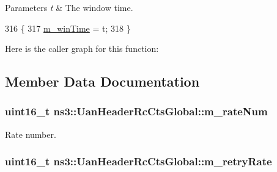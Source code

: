 \begin{DoxyParams}{Parameters}
{\em t} & The window time. \\
\hline
\end{DoxyParams}

\begin{DoxyCode}
316 \{
317   \hyperlink{classns3_1_1UanHeaderRcCtsGlobal_a94365aeacbedf98a9a92b3c310a591d3}{m\_winTime} = t;
318 \}
\end{DoxyCode}


Here is the caller graph for this function\+:




\subsection{Member Data Documentation}
\subsubsection[{\texorpdfstring{m\+\_\+rate\+Num}{m_rateNum}}]{\setlength{\rightskip}{0pt plus 5cm}uint16\+\_\+t ns3\+::\+Uan\+Header\+Rc\+Cts\+Global\+::m\+\_\+rate\+Num\hspace{0.3cm}{\ttfamily [private]}}\hypertarget{classns3_1_1UanHeaderRcCtsGlobal_aab64634e1ec36ba1f872ec8ce0054958}{}\label{classns3_1_1UanHeaderRcCtsGlobal_aab64634e1ec36ba1f872ec8ce0054958}


Rate number. 

\subsubsection[{\texorpdfstring{m\+\_\+retry\+Rate}{m_retryRate}}]{\setlength{\rightskip}{0pt plus 5cm}uint16\+\_\+t ns3\+::\+Uan\+Header\+Rc\+Cts\+Global\+::m\+\_\+retry\+Rate\hspace{0.3cm}{\ttfamily [private]}}\hypertarget{classns3_1_1UanHeaderRcCtsGlobal_aa7588bb1625f48a895edc716b65bf24d}{}\label{classns3_1_1UanHeaderRcCtsGlobal_aa7588bb1625f48a895edc716b65bf24d}


